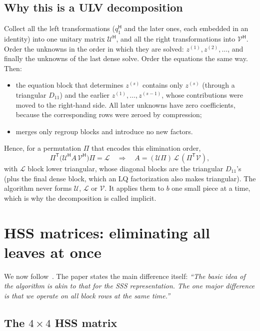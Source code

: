 \documentclass[11pt]{article}
\newcommand{\ct}{^{\mathsf H}}            %
\theoremstyle{definition}
\begin{document}
\subsection{Why this is a ULV decomposition}
\label{sec:sss-ulv}

Collect all the left transformations ($q_1\ct$ and the later ones, each embedded
in an identity) into one unitary matrix $\mathcal U\ct$, and all the right
transformations into $\mathcal V\ct$. Order the unknowns in the order in
which they are solved: $z^{(1)}, z^{(2)},\dots$, and finally the unknowns of the
last dense solve. Order the equations the same way. Then:
\begin{itemize}
  \item the equation block that determines $z^{(s)}$ contains only $z^{(s)}$
    (through a triangular $D_{11}$) and the earlier $z^{(1)},\dots,z^{(s-1)}$, whose contributions
    were moved to the right-hand side. All later unknowns have zero coefficients,
    because the corresponding rows were zeroed by compression;
  \item merges only regroup blocks and introduce no new factors.
\end{itemize}
Hence, for a permutation $\Pi$ that encodes this elimination order,
\[
\Pi^{\mathsf T}\bigl(\mathcal U\ct A\,\mathcal V\ct\bigr)\Pi = \mathcal L
\quad\Longrightarrow\quad
A = (\mathcal U\Pi)\,\mathcal L\,(\Pi^{\mathsf T}\mathcal V),
\]
with $\mathcal L$ block lower triangular, whose diagonal blocks are the triangular
$D_{11}$'s (plus the final dense block, which an LQ factorization also makes triangular).
The algorithm never forms $\mathcal U$, $\mathcal L$ or $\mathcal V$. It applies
them to $b$ one small piece at a time, which is why the decomposition is called implicit.

\section{HSS matrices: eliminating all leaves at once}
\label{sec:hss}

We now follow~\cite[Section~4]{CGP06}. The paper states the main
difference itself: \emph{``The basic idea of the algorithm is akin to that for the SSS
representation. The one major difference is that we operate on all block rows at
the same time.''}

\subsection{\texorpdfstring{The $4\times4$ HSS matrix}{The 4x4 HSS matrix}}
\end{document}
